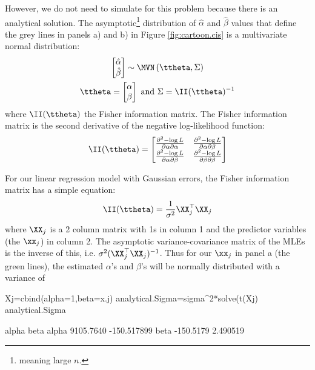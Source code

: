 However, we do not need to simulate for this problem because there is an analytical solution.
The asymptotic\footnote{meaning large $n$.} distribution of $\hat{\alpha}$ and $\hat{\beta}$ values that define the grey lines in panels a) and b) in Figure \ref{fig:cartoon.cis} is a multivariate normal distribution:
\begin{equation}
\begin{gathered}
\begin{bmatrix}\hat{\alpha}\\\hat{\beta}\end{bmatrix} \sim \MVN\left(
\ttheta, \Sigma \right)\\
\ttheta = \begin{bmatrix}\alpha\\ \beta\end{bmatrix}\text{ and } \Sigma = \II(\ttheta)^{-1}
\end{gathered}
\label{eqn:dist.mls}
\end{equation}
where $\II(\ttheta)$ the Fisher information matrix.  The Fisher information matrix is the second derivative of the negative log-likelihood function:
$$\II(\ttheta)=\begin{bmatrix}
\frac{\partial^2-\log L}{\partial\alpha \partial\alpha}&\frac{\partial^2-\log L}{\partial\alpha \partial\beta}\\
\frac{\partial^2 -\log L}{\partial\alpha \partial\beta}&\frac{\partial^2 -\log L}{\partial\beta \partial\beta}
\end{bmatrix}$$

For our linear regression model with Gaussian errors, the Fisher information matrix has a simple equation: 
$$\II(\ttheta)=\frac{1}{\sigma^2}\XX_j^\top\XX_j$$
where $\XX_j$ is a 2 column matrix with 1s in column 1 and the predictor variables (the $\xx_j$) in column 2.  The asymptotic variance-covariance matrix of the MLEs is the inverse of this, i.e. $\sigma^2( \XX_j^\top\XX_j)^{-1}$. Thus for our $\xx_j$ in panel a (the green lines), the estimated $\alpha$'s and $\beta$'s will be normally distributed with a variance of
\begin{Schunk}
\begin{Sinput}
 Xj=cbind(alpha=1,beta=x.j)
 analytical.Sigma=sigma^2*solve(t(Xj)%*%Xj)
 analytical.Sigma
\end{Sinput}
\begin{Soutput}
          alpha        beta
alpha 9105.7640 -150.517899
beta  -150.5179    2.490519
\end{Soutput}
\end{Schunk}

